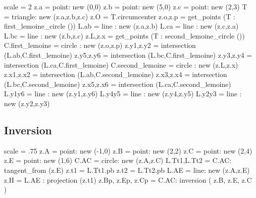 \begin{tkzelements}
scale     = 2
z.a   = point:  new (0,0)
z.b   = point:  new (5,0)
z.c   = point:  new (2,3)
T     = triangle: new (z.a,z.b,z.c)
z.O   = T.circumcenter
z.o,z.p   = get_points (T : first_lemoine_circle ())
L.ab      = line : new (z.a,z.b)
L.ca      = line : new (z.c,z.a)
L.bc      = line : new (z.b,z.c)
z.L,z.x   = get_points (T : second_lemoine_circle ())
C.first_lemoine   = circle : new (z.o,z.p)
z.y1,z.y2     = intersection (L.ab,C.first_lemoine)
z.y5,z.y6     = intersection (L.bc,C.first_lemoine)
z.y3,z.y4     = intersection (L.ca,C.first_lemoine)
C.second_lemoine  = circle : new (z.L,z.x)
z.x1,z.x2     = intersection (L.ab,C.second_lemoine)
z.x3,z.x4     = intersection (L.bc,C.second_lemoine)
z.x5,z.x6     = intersection (L.ca,C.second_lemoine)
L.y1y6    = line : new (z.y1,z.y6)
L.y4y5    = line : new (z.y4,z.y5)
L.y2y3    = line : new (z.y2,z.y3)
\end{tkzelements}


\begin{center}
\end{center}



\subsection{Inversion} %
\label{sub:inversion}

\begin{tkzelements}
scale = .75
z.A     = point: new (-1,0)
z.B     = point: new (2,2)
z.C     = point: new (2,4)
z.E     = point: new (1,6)
C.AC    = circle:    new (z.A,z.C)
L.Tt1,L.Tt2 = C.AC: tangent_from (z.E)
z.t1    = L.Tt1.pb
z.t2    = L.Tt2.pb
L.AE    = line: new (z.A,z.E)
z.H     = L.AE : projection (z.t1)
z.Bp,
z.Ep,
z.Cp    = C.AC: inversion ( z.B, z.E, z.C )
\end{tkzelements}



